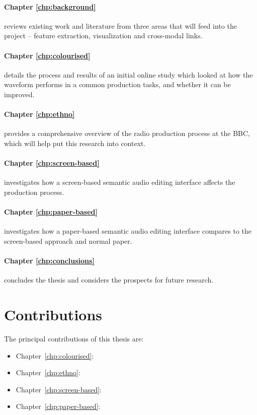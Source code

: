 \paragraph{Chapter \ref{chp:background}} reviews existing work and literature
from three areas that will feed into the project -- feature extraction,
visualization and cross-modal links.

\paragraph{Chapter \ref{chp:colourised}} details the process and results of an
initial online study which looked at how the waveform performs in a common
production tasks, and whether it can be improved.

\paragraph{Chapter \ref{chp:ethno}} provides a comprehensive overview of
the radio production process at the BBC, which will help put this research into
context.

\paragraph{Chapter \ref{chp:screen-based}} investigates how a screen-based semantic audio editing interface affects the
production process.

\paragraph{Chapter \ref{chp:paper-based}} investigates how a paper-based semantic audio editing interface compares to
the screen-based approach and normal paper.

\paragraph{Chapter \ref{chp:conclusions}} concludes the thesis and considers the prospects for future research.

\section{Contributions}\label{sec:intro/contributions}

The principal contributions of this thesis are:
\begin{itemize}
  \item Chapter~\ref{chp:colourised}: 
  \item Chapter~\ref{chp:ethno}: 
  \item Chapter~\ref{chp:screen-based}: 
  \item Chapter~\ref{chp:paper-based}: 
\end{itemize}

